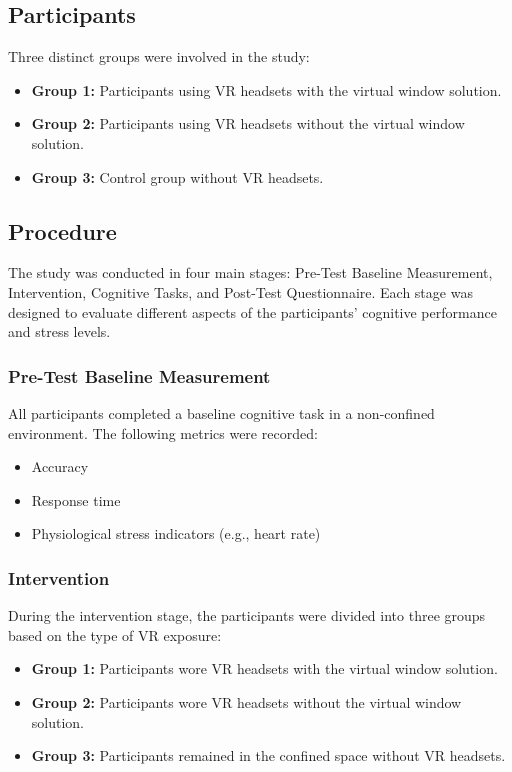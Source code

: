 \documentclass[runningheads]{llncs}
\begin{document}
\subsection{Participants}

Three distinct groups were involved in the study:

\begin{itemize}
    \item \textbf{Group 1:} Participants using VR headsets with the virtual window solution.
    \item \textbf{Group 2:} Participants using VR headsets without the virtual window solution.
    \item \textbf{Group 3:} Control group without VR headsets.
\end{itemize}

\subsection{Procedure}

The study was conducted in four main stages: Pre-Test Baseline Measurement, Intervention, Cognitive Tasks, and Post-Test Questionnaire. Each stage was designed to evaluate different aspects of the participants' cognitive performance and stress levels.

\subsubsection{Pre-Test Baseline Measurement}

All participants completed a baseline cognitive task in a non-confined environment. The following metrics were recorded:

\begin{itemize}
    \item Accuracy
    \item Response time
    \item Physiological stress indicators (e.g., heart rate)
\end{itemize}

\subsubsection{Intervention}

During the intervention stage, the participants were divided into three groups based on the type of VR exposure:

\begin{itemize}
    \item \textbf{Group 1:} Participants wore VR headsets with the virtual window solution.
    \item \textbf{Group 2:} Participants wore VR headsets without the virtual window solution.
    \item \textbf{Group 3:} Participants remained in the confined space without VR headsets.
\end{itemize}
\end{document}
